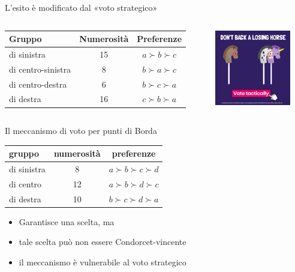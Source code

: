 \documentclass[aspectratio=64,11pt]{beamer}
\begin{document}
\begin{frame}{L'esito è modificato dal «voto strategico»}
\begin{columns}
\begin{column}{.7\columnwidth}
\begin{tabular}{lcc}\toprule
Gruppo & Numerosità &Preferenze\\
\midrule
di sinistra & 15 & $a \succ b \succ c$ \\
di centro-sinistra & 8 & $b \succ a \succ c$ \\
di centro-destra & 6 & $b \succ c \succ a$ \\
di destra & 16 & $c \succ b \succ a$ \\\bottomrule
\end{tabular}
\end{column}

\begin{column}{.3\columnwidth}
\begin{center}
\includegraphics[width=3.3cm]{./figure/vote-tactically.png}
\end{center}
\end{column}
\end{columns}
\end{frame}

\begin{frame}{Il meccanismo di voto per punti di Borda}
\begin{center}
\begin{tabular}{lcc}\toprule
  gruppo & numerosità &preferenze\\
  \midrule
  di sinistra & 8 & $a \succ b \succ c\succ d$ \\
  di centro & 12 & $a \succ b \succ d\succ c$ \\
  di destra & 10 & $b \succ c \succ d\succ a$ \\\bottomrule
\end{tabular}
\end{center}

\begin{itemize}
\item Garantisce una scelta, ma
\item tale scelta può non essere Condorcet-vincente
\item il meccanismo è vulnerabile al voto strategico
\end{itemize}
\end{frame}
\end{document}
